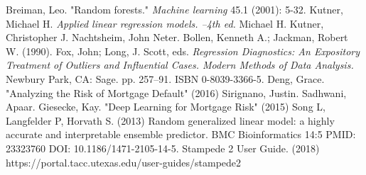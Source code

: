 \newpage
\begin{thebibliography}{99}
Breiman, Leo. "Random forests." \textit{Machine learning} 45.1 (2001): 5-32.
Kutner, Michael H. 
\textit{Applied linear regression models. --4th ed.} Michael H. Kutner, Christopher J. Nachtsheim, John Neter.
Bollen, Kenneth A.; Jackman, Robert W. (1990). Fox, John; Long, J. Scott, eds. 
\textit{Regression Diagnostics: An Expository Treatment of Outliers and Influential Cases. Modern Methods of Data Analysis.}
Newbury Park, CA: Sage. pp. 257–91. ISBN 0-8039-3366-5.
Deng, Grace. "Analyzing the Risk of Mortgage Default" (2016)
Sirignano, Justin. Sadhwani, Apaar. Giesecke, Kay. "Deep Learning for Mortgage Risk" (2015)
Song L, Langfelder P, Horvath S. (2013) Random generalized linear model: a highly accurate and interpretable ensemble predictor. BMC Bioinformatics 14:5 PMID: 23323760 DOI: 10.1186/1471-2105-14-5.
Stampede 2 User Guide. (2018) https://portal.tacc.utexas.edu/user-guides/stampede2
\end{thebibliography}

